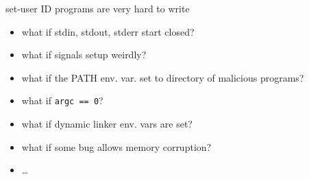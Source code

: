 \begin{frame}{set-user ID programs are very hard to write}
\begin{itemize}
\item what if stdin, stdout, stderr start closed?
\item what if signals setup weirdly?
\item what if the PATH env. var. set to directory of malicious programs?
\item what if \texttt{argc == 0}?
\item what if dynamic linker env. vars are set?
\item what if some bug allows memory corruption?
\item \ldots
\end{itemize}
\end{frame}
